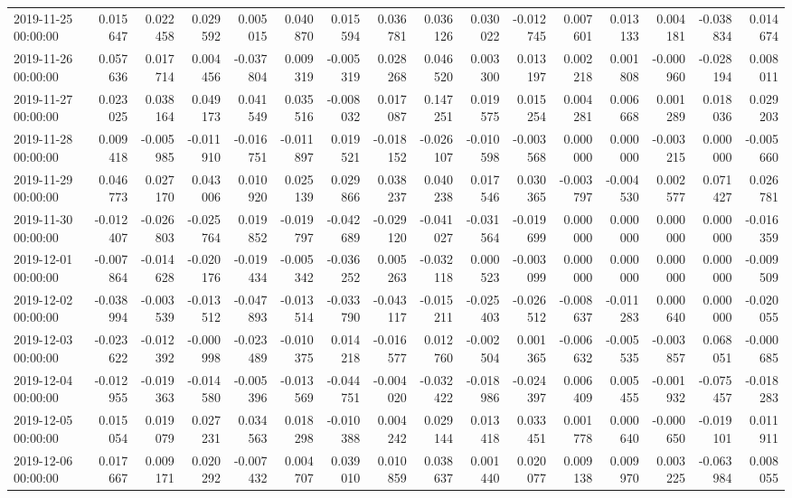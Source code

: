 \begin{tabular}{lrrrrrrrrrrrrrrr}
2019-11-25 00:00:00 & 0.015647 & 0.022458 & 0.029592 & 0.005015 & 0.040870 & 0.015594 & 0.036781 & 0.036126 & 0.030022 & -0.012745 & 0.007601 & 0.013133 & 0.004181 & -0.038834 & 0.014674 \\
2019-11-26 00:00:00 & 0.057636 & 0.017714 & 0.004456 & -0.037804 & 0.009319 & -0.005319 & 0.028268 & 0.046520 & 0.003300 & 0.013197 & 0.002218 & 0.001808 & -0.000960 & -0.028194 & 0.008011 \\
2019-11-27 00:00:00 & 0.023025 & 0.038164 & 0.049173 & 0.041549 & 0.035516 & -0.008032 & 0.017087 & 0.147251 & 0.019575 & 0.015254 & 0.004281 & 0.006668 & 0.001289 & 0.018036 & 0.029203 \\
2019-11-28 00:00:00 & 0.009418 & -0.005985 & -0.011910 & -0.016751 & -0.011897 & 0.019521 & -0.018152 & -0.026107 & -0.010598 & -0.003568 & 0.000000 & 0.000000 & -0.003215 & 0.000000 & -0.005660 \\
2019-11-29 00:00:00 & 0.046773 & 0.027170 & 0.043006 & 0.010920 & 0.025139 & 0.029866 & 0.038237 & 0.040238 & 0.017546 & 0.030365 & -0.003797 & -0.004530 & 0.002577 & 0.071427 & 0.026781 \\
2019-11-30 00:00:00 & -0.012407 & -0.026803 & -0.025764 & 0.019852 & -0.019797 & -0.042689 & -0.029120 & -0.041027 & -0.031564 & -0.019699 & 0.000000 & 0.000000 & 0.000000 & 0.000000 & -0.016359 \\
2019-12-01 00:00:00 & -0.007864 & -0.014628 & -0.020176 & -0.019434 & -0.005342 & -0.036252 & 0.005263 & -0.032118 & 0.000523 & -0.003099 & 0.000000 & 0.000000 & 0.000000 & 0.000000 & -0.009509 \\
2019-12-02 00:00:00 & -0.038994 & -0.003539 & -0.013512 & -0.047893 & -0.013514 & -0.033790 & -0.043117 & -0.015211 & -0.025403 & -0.026512 & -0.008637 & -0.011283 & 0.000640 & 0.000000 & -0.020055 \\
2019-12-03 00:00:00 & -0.023622 & -0.012392 & -0.000998 & -0.023489 & -0.010375 & 0.014218 & -0.016577 & 0.012760 & -0.002504 & 0.001365 & -0.006632 & -0.005535 & -0.003857 & 0.068051 & -0.000685 \\
2019-12-04 00:00:00 & -0.012955 & -0.019363 & -0.014580 & -0.005396 & -0.013569 & -0.044751 & -0.004020 & -0.032422 & -0.018986 & -0.024397 & 0.006409 & 0.005455 & -0.001932 & -0.075457 & -0.018283 \\
2019-12-05 00:00:00 & 0.015054 & 0.019079 & 0.027231 & 0.034563 & 0.018298 & -0.010388 & 0.004242 & 0.029144 & 0.013418 & 0.033451 & 0.001778 & 0.000640 & -0.000650 & -0.019101 & 0.011911 \\
2019-12-06 00:00:00 & 0.017667 & 0.009171 & 0.020292 & -0.007432 & 0.004707 & 0.039010 & 0.010859 & 0.038637 & 0.001440 & 0.020077 & 0.009138 & 0.009970 & 0.003225 & -0.063984 & 0.008055 \\

\end{tabular}
